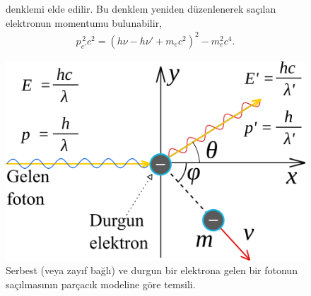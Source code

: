 \documentclass[a4paper,12pt, twoside]{article}
\begin{document}
\begin{figure}[hbtp]
\begin{minipage}{0.45\textwidth}
denklemi elde edilir. Bu denklem yeniden düzenlenerek saçılan elektronun momentumu bulunabilir,
\begin{align}
\label{eq:compton_E_conv4}
p_{e'}^{\, 2}c^2 = (h\nu - h\nu' + m_{e}c^2)^2-m_{e}^2c^4.
\end{align}
\end{minipage}
\hspace{12pt}
\begin{minipage}{0.54\textwidth}
{\center
\includegraphics[scale=1.2]{Compton_effect_illust.png}
\caption{Serbest (veya zayıf bağlı) ve durgun bir elektrona gelen bir fotonun saçılmasının parçacık modeline göre temsili.}
\label{fig:compton_duzenek}}

\vspace{12pt}


\end{minipage}
\end{figure}
\end{document}
